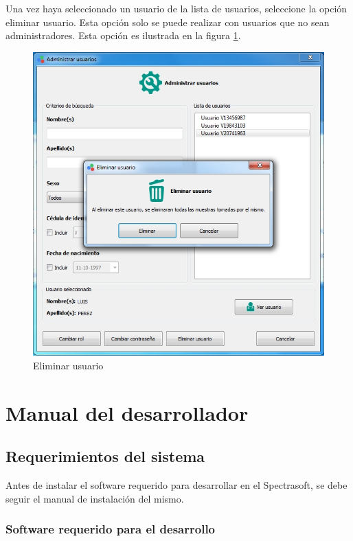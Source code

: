 		Una vez haya seleccionado un usuario de la lista de usuarios, seleccione la opci\'{o}n eliminar usuario. Esta opci\'{o}n solo se puede realizar con usuarios que no sean administradores. Esta opci\'{o}n es ilustrada en la figura \ref{fig:eliminar-usuario}.
\vfill
\begin{figure}[H]
  \centering
  \includegraphics[width=1\linewidth]{./img/administrar-eliminar.jpg}
\caption[]{Eliminar usuario\label{fig:eliminar-usuario}}
\end{figure}
\vfill
\newpage
\chapter{Manual del desarrollador}
\thispagestyle{fancy}

\section{Requerimientos del sistema}

	Antes de instalar el software requerido para desarrollar en el Spectrasoft, se debe seguir el manual de instalaci\'{o}n del mismo.
	
\subsection*{Software requerido para el desarrollo}


